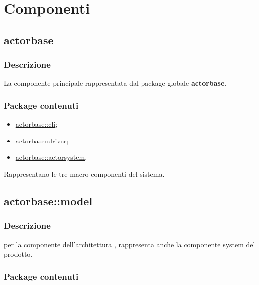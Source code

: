 \documentclass{scalatekids-article}
\begin{document}
\section{Componenti}

\subsection{actorbase}
\label{sec:actorbase}



\subsubsection{Descrizione}

La componente principale rappresentata dal package globale \textbf{actorbase}.

\subsubsection{Package contenuti}

\begin{itemize}
\item \hyperref[sec:actorbase::cli]{actorbase::cli};
\item \hyperref[sec:actorbase::driver]{actorbase::driver};
\item \hyperref[sec:actorbase::actorsystem]{actorbase::actorsystem}.
\end{itemize}

Rappresentano le tre macro-componenti del sistema.

\subsection{actorbase::model}
\label{sec:actorbase::model}

\subsubsection{Descrizione}

 per la componente  dell'architettura ,
rappresenta anche la componente system del prodotto.

\subsubsection{Package contenuti}
\end{document}
